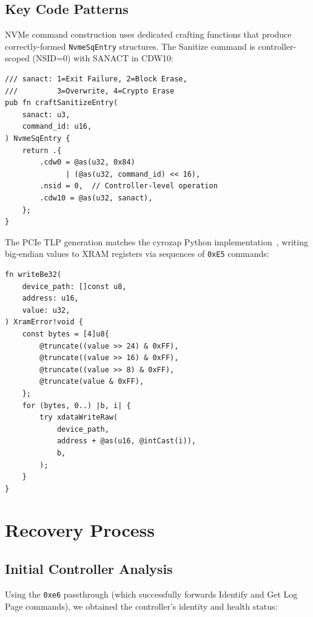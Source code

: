 \documentclass[conference]{IEEEtran}
\begin{document}
\subsection{Key Code Patterns}
\label{sec:code-patterns}

NVMe command construction uses dedicated crafting functions that produce
correctly-formed \texttt{NvmeSqEntry} structures. The Sanitize command
is controller-scoped (NSID=0) with SANACT in CDW10:

\begin{lstlisting}[language=Zig,caption={Sanitize Block Erase SQE
construction.},label={lst:sanitize-craft}]
/// sanact: 1=Exit Failure, 2=Block Erase,
///         3=Overwrite, 4=Crypto Erase
pub fn craftSanitizeEntry(
    sanact: u3,
    command_id: u16,
) NvmeSqEntry {
    return .{
        .cdw0 = @as(u32, 0x84)
              | (@as(u32, command_id) << 16),
        .nsid = 0,  // Controller-level operation
        .cdw10 = @as(u32, sanact),
    };
}
\end{lstlisting}

The PCIe TLP generation matches the cyrozap Python
implementation~\cite{cyrozap-usb-pcie}, writing big-endian values to
XRAM registers via sequences of \texttt{0xE5} commands:

\begin{lstlisting}[language=Zig,caption={Big-endian u32 write to XRAM
via four 0xE5 commands.},label={lst:be32}]
fn writeBe32(
    device_path: []const u8,
    address: u16,
    value: u32,
) XramError!void {
    const bytes = [4]u8{
        @truncate((value >> 24) & 0xFF),
        @truncate((value >> 16) & 0xFF),
        @truncate((value >> 8) & 0xFF),
        @truncate(value & 0xFF),
    };
    for (bytes, 0..) |b, i| {
        try xdataWriteRaw(
            device_path,
            address + @as(u16, @intCast(i)),
            b,
        );
    }
}
\end{lstlisting}


\section{Recovery Process}
\label{sec:recovery}

\subsection{Initial Controller Analysis}
\label{sec:initial-analysis}

Using the \texttt{0xe6} passthrough (which successfully forwards
Identify and Get Log Page commands), we obtained the controller's
identity and health status:
\end{document}
